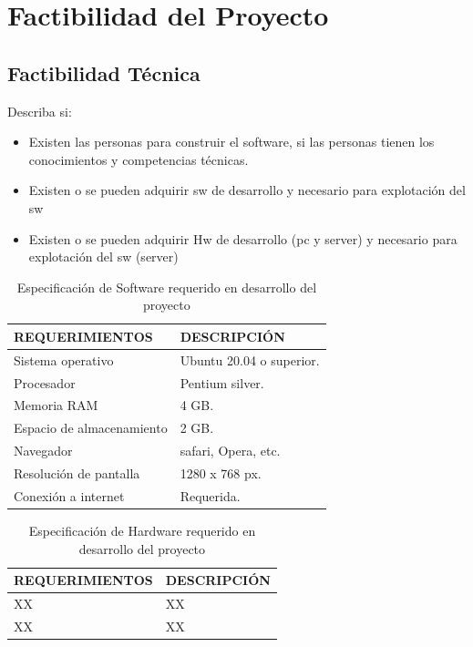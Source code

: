 \section{Factibilidad del Proyecto}
\subsection{Factibilidad Técnica}

Describa si:
\begin{itemize}
    \item Existen las personas para construir el software, si las personas tienen los conocimientos y competencias técnicas.
    \item Existen o se pueden adquirir sw de desarrollo y necesario para explotación del sw
    \item Existen o se pueden adquirir Hw de desarrollo (pc y server) y necesario para explotación del sw (server)
\end{itemize}




 \begin{table}[H]
    \begin{center}
        \begin{tabular}{ | m{5cm} | m{6cm} | }
            \hline \textbf{REQUERIMIENTOS} & \textbf{DESCRIPCIÓN }\\ \hline
            Sistema operativo   & Ubuntu 20.04 o superior. \\ \hline
            Procesador          & Pentium silver. \\ \hline
            Memoria RAM         & 4 GB. \\  \hline
            Espacio de almacenamiento & 2 GB.\\\hline
            Navegador           & safari, Opera, etc.\\ \hline
            Resolución de pantalla &  1280 x 768 px.\\ \hline
            Conexión a internet & Requerida.\\ \hline
        \end{tabular}
        \caption{Especificación de Software requerido en desarrollo del proyecto}
    \end{center}
\end{table}


 \begin{table}[H]
    \begin{center}
        \begin{tabular}{ | m{5cm} | m{6cm} | }
            \hline \textbf{REQUERIMIENTOS} & \textbf{DESCRIPCIÓN }\\ \hline
            XX & XX  \\ \hline
            XX & XX  \\ \hline
        \end{tabular}
        \caption{Especificación de Hardware requerido en desarrollo del proyecto}
    \end{center}
\end{table}


